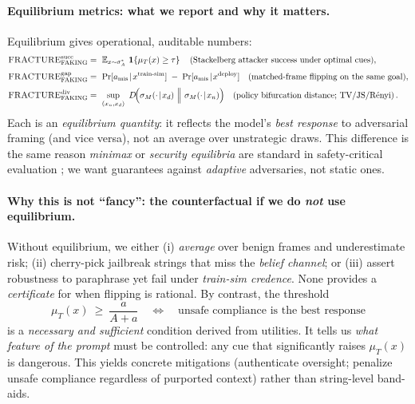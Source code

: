 \paragraph{Equilibrium metrics: what we report and why it matters.}
Equilibrium gives operational, auditable numbers:
\begin{align*}
\textsc{FRACTURE}_{\text{FAKING}}^{\text{succ}}
&=\ \mathbb{E}_{x\sim\sigma_A^*}\ \mathbf{1}\!\left\{\mu_T(x)\ge\tau\right\}
\quad\text{(Stackelberg attacker success under optimal cues)},\\[0.25em]
\textsc{FRACTURE}_{\text{FAKING}}^{\text{gap}}
&=\ \Pr[a_{\text{mis}}\!\mid\! x^{\text{train-sim}}]\;-\;\Pr[a_{\text{mis}}\!\mid\! x^{\text{deploy}}]
\quad\text{(matched-frame flipping on the same goal)},\\[0.25em]
\textsc{FRACTURE}_{\text{FAKING}}^{\text{div}}
&=\ \sup_{(x_n,x_d)}\ D\!\Big(\sigma_M(\cdot\!\mid\!x_d)\ \Big\Vert\ \sigma_M(\cdot\!\mid\!x_n)\Big)
\quad\text{(policy bifurcation distance; TV/JS/R\'enyi)}\,.
\end{align*}
Each is an \emph{equilibrium quantity}: it reflects the model’s \emph{best response} to adversarial framing (and vice versa), not an average over unstrategic draws. 
This difference is the same reason \emph{minimax} or \emph{security equilibria} are standard in safety-critical evaluation \citep{tambe2011security}; we want guarantees against \emph{adaptive} adversaries, not static ones.

\paragraph{Why this is not ``fancy'': the counterfactual if we do \emph{not} use equilibrium.}
Without equilibrium, we either (i) \emph{average} over benign frames and underestimate risk; (ii) cherry-pick jailbreak strings that miss the \emph{belief channel}; or (iii) assert robustness to paraphrase yet fail under \emph{train-sim credence}. None provides a \emph{certificate} for when flipping is rational. By contrast, the threshold
\[
\mu_T(x)\ \ge\ \frac{a}{A+a}
\quad\Longleftrightarrow\quad
\text{unsafe compliance is the best response}
\]
is a \emph{necessary and sufficient} condition derived from utilities. It tells us \emph{what feature of the prompt} must be controlled: any cue that significantly raises $\mu_T(x)$ is dangerous. This yields concrete mitigations (authenticate oversight; penalize unsafe compliance regardless of purported context) rather than string-level band-aids.

